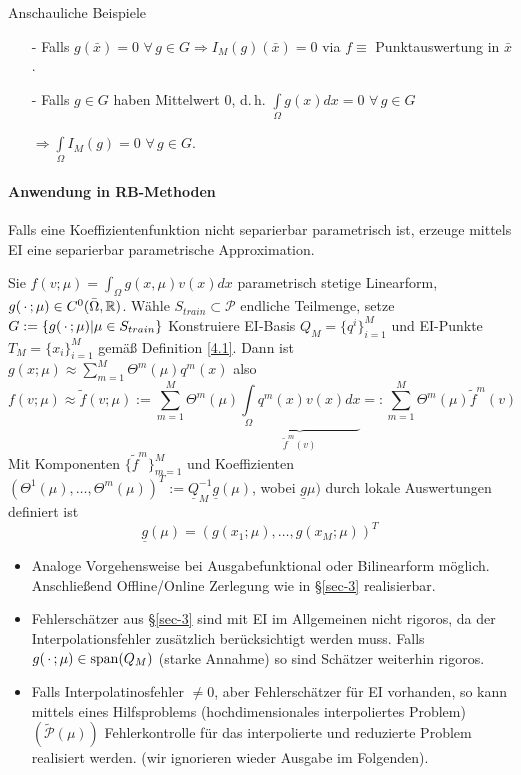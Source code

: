 \begin{bem} Anschauliche Beispiele
	\begin{itemize}
		\item[-] Falls $g(\bar{x}) = 0 \,\, \forall \, g \in G \Rightarrow I_M(g) (\bar{x})=0$ via $f \equiv$ Punktauswertung in $\bar{x}$.
		\item[-] Falls $g \in G$ haben Mittelwert $0$, d.\,h. $\int\limits_{\Omega} g(x) dx = 0 \,\, \forall \, g \in G$
		
		$\Rightarrow \int\limits_{\Omega} I_M(g) = 0 \,\, \forall \, g \in G.$
	\end{itemize}
\end{bem}

\paragraph*{Anwendung in RB-Methoden}
Falls eine Koeffizientenfunktion nicht separierbar parametrisch ist, erzeuge mittels EI eine separierbar parametrische Approximation.

\begin{defn}
Sie $f(v; \mu) = \int_{\Omega} g(x, \mu) v(x) dx$ parametrisch stetige Linearform, $g(\,\cdot\,; \mu) \in C^0 (\bar{\Omega},\mathbb{R})$. Wähle $S_{train} \subset \mathcal{P}$ endliche Teilmenge, setze $G:= \{ g(\,\cdot\,;\mu) | \mu \in S_{train} \}$ Konstruiere EI-Basis $Q_M = \{q^i\}_{i=1}^M$ und EI-Punkte $T_M = \{x_i\}_{i=1}^M$ gemäß Definition \ref{4.1}. Dann ist $g(x;\mu) \approx \sum\limits_{m=1}^M \Theta^m(\mu)q^m(x)$ also
\[
	f(v;\mu) \approx \tilde{f}(v;\mu) := \sum\limits_{m=1}^M \Theta^m (\mu) \underbrace{\int\limits_{\Omega} q^m(x)v(x) dx}_{\tilde{f}^m(v)} =: \sum\limits_{m=1}^M \Theta^m(\mu) \tilde{f}^m(v)
\] 
Mit Komponenten $\{\tilde{f}^m\}_{m=1}^M$ und Koeffizienten $(\Theta^1(\mu), \dots, \Theta^m(\mu))^T := \underline{Q}_{M}^{-1} \underline{g}(\mu)$, wobei $\underline{g}\mu)$ durch lokale Auswertungen definiert ist
\[
	\underline{g}(\mu) = (g(x_1;\mu),\dots,g(x_M;\mu))^T
\]
\end{defn}

\begin{bem} \beginwithlistbem
	\begin{itemize}
		\item Analoge Vorgehensweise bei Ausgabefunktional oder Bilinearform möglich. Anschließend Offline/Online Zerlegung wie in §\ref{sec-3} realisierbar.
		\item Fehlerschätzer aus §\ref{sec-3} sind mit EI  im Allgemeinen nicht rigoros, da der Interpolationsfehler zusätzlich berücksichtigt werden muss. Falls $g(\,\cdot\,;\mu) \in \operatorname{span} (Q_M)$ (starke Annahme) so sind Schätzer weiterhin rigoros.
		\item Falls Interpolatinosfehler $\neq 0$, aber Fehlerschätzer für EI vorhanden, so kann mittels eines Hilfsproblems (hochdimensionales interpoliertes Problem) $(\tilde{\mathcal{P}}(\mu))$ Fehlerkontrolle für das interpolierte und reduzierte Problem realisiert werden. (wir ignorieren wieder Ausgabe im Folgenden).
	\end{itemize}
\end{bem}

